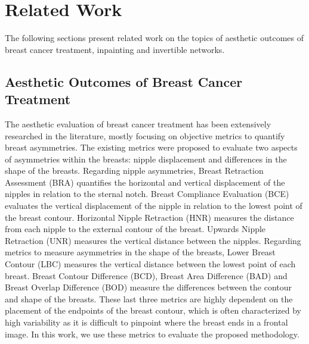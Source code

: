 \section{Related Work}
The following sections present related work on the topics of aesthetic outcomes of breast cancer treatment, inpainting and invertible networks.

\subsection{Aesthetic Outcomes of Breast Cancer Treatment} \label{sec:related-work}

The aesthetic evaluation of breast cancer treatment has been extensively researched in the literature, mostly focusing on objective metrics to quantify breast asymmetries. The existing metrics were proposed to evaluate two aspects of asymmetries within the breasts: nipple displacement and differences in the shape of the breasts. Regarding nipple asymmetries, Breast Retraction Assessment (BRA) \cite{pezner1985breast} quantifies the horizontal and vertical displacement of the nipples in relation to the sternal notch. Breast Compliance Evaluation (BCE) \cite{tsouskas1990breast} evaluates the vertical displacement of the nipple in relation to the lowest point of the breast contour. Horizontal Nipple Retraction (HNR) \cite{freitas2024isbi} measures the distance from each nipple to the external contour of the breast. Upwards Nipple Retraction (UNR) \cite{van1989cosmetic} measures the vertical distance between the nipples. Regarding metrics to measure asymmetries in the shape of the breasts, Lower Breast Contour (LBC) \cite{van1989cosmetic}  measures the vertical distance between the lowest point of each breast. Breast Contour Difference (BCD), Breast Area Difference (BAD) and Breast Overlap Difference (BOD) \cite{cardoso2007towards} measure the differences between the contour and shape of the breasts. These last three metrics are highly dependent on the placement of the endpoints of the breast contour, which is often characterized by high variability as it is difficult to pinpoint where the breast ends in a frontal image. In this work, we use these metrics to evaluate the proposed methodology. 

